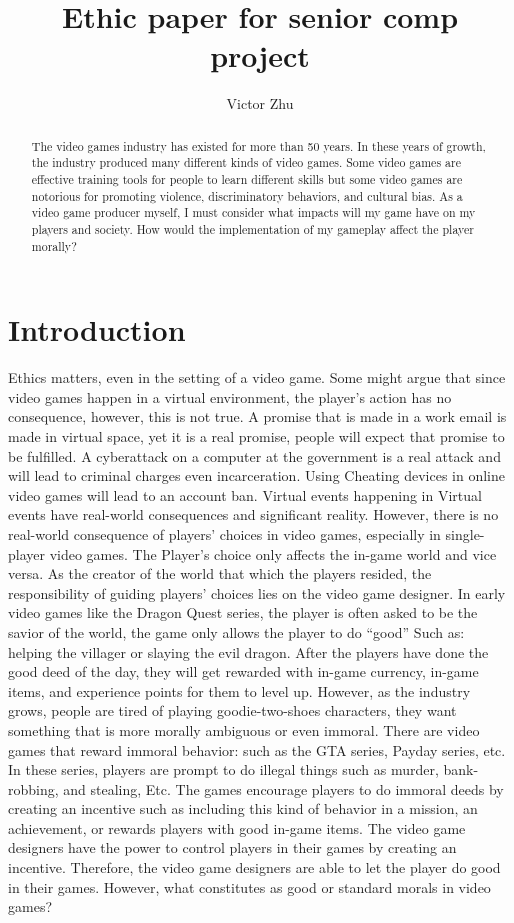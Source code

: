 \documentclass[10pt,twocolumn]{article}
\title{Ethic paper for senior comp project}
\author{Victor Zhu}
\affiliation{Occidental College}
\begin{document}
\maketitle

\begin{abstract}
   The video games industry has existed for more than 50 years. In these years of growth, the industry produced many different kinds of video games. Some video games are effective training tools for people to learn different skills but some video games are notorious for promoting violence, discriminatory behaviors, and cultural bias. As a video game producer myself, I must consider what impacts will my game have on my players and society. How would the implementation of my gameplay affect the player morally?  

\end{abstract}

\section{Introduction}

Ethics matters, even in the setting of a video game.  Some might argue that since video games happen in a virtual environment, the player's action has no consequence, however, this is not true. A promise that is made in a work email is made in virtual space, yet it is a real promise, people will expect that promise to be fulfilled. A cyberattack on a computer at the government is a real attack and will lead to criminal charges even incarceration. Using Cheating devices in online video games will lead to an account ban. Virtual events happening in Virtual events have real-world consequences and significant reality.
However, there is no real-world consequence of players’ choices in video games, especially in single-player video games. The Player’s choice only affects the in-game world and vice versa.  As the creator of the world that which the players resided, the responsibility of guiding players’ choices lies on the video game designer. In early video games like the Dragon Quest series, the player is often asked to be the savior of the world, the game only allows the player to do “good” Such as: helping the villager or slaying the evil dragon. After the players have done the good deed of the day, they will get rewarded with in-game currency, in-game items, and experience points for them to level up. However, as the industry grows, people are tired of playing goodie-two-shoes characters, they want something that is more morally ambiguous or even immoral. There are video games that reward immoral behavior: such as the GTA series, Payday series, etc. In these series, players are prompt to do illegal things such as murder, bank-robbing, and stealing, Etc. The games encourage players to do immoral deeds by creating an incentive such as including this kind of behavior in a mission,  an achievement, or rewards players with good in-game items.  The video game designers have the power to control players in their games by creating an incentive. Therefore, the video game designers are able to let the player do good in their games. However, what constitutes as good or standard morals in video games? 
\end{document}
